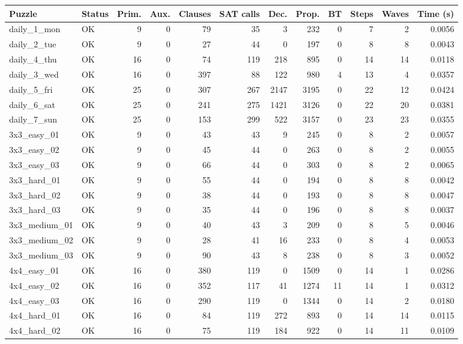 \begin{tabular}{l l r r r r r r r r r r }
\hline
Puzzle & Status & Prim. & Aux. & Clauses & SAT calls & Dec. & Prop. & BT & Steps & Waves & Time (s) \\
\hline
daily\_1\_mon & OK & 9 & 0 & 79 & 35 & 3 & 232 & 0 & 7 & 2 & 0.0056 \\
daily\_2\_tue & OK & 9 & 0 & 27 & 44 & 0 & 197 & 0 & 8 & 8 & 0.0043 \\
daily\_4\_thu & OK & 16 & 0 & 74 & 119 & 218 & 895 & 0 & 14 & 14 & 0.0118 \\
daily\_3\_wed & OK & 16 & 0 & 397 & 88 & 122 & 980 & 4 & 13 & 4 & 0.0357 \\
daily\_5\_fri & OK & 25 & 0 & 307 & 267 & 2147 & 3195 & 0 & 22 & 12 & 0.0424 \\
daily\_6\_sat & OK & 25 & 0 & 241 & 275 & 1421 & 3126 & 0 & 22 & 20 & 0.0381 \\
daily\_7\_sun & OK & 25 & 0 & 153 & 299 & 522 & 3157 & 0 & 23 & 23 & 0.0355 \\
3x3\_easy\_01 & OK & 9 & 0 & 43 & 43 & 9 & 245 & 0 & 8 & 2 & 0.0057 \\
3x3\_easy\_02 & OK & 9 & 0 & 45 & 44 & 0 & 263 & 0 & 8 & 2 & 0.0055 \\
3x3\_easy\_03 & OK & 9 & 0 & 66 & 44 & 0 & 303 & 0 & 8 & 2 & 0.0065 \\
3x3\_hard\_01 & OK & 9 & 0 & 55 & 44 & 0 & 194 & 0 & 8 & 8 & 0.0042 \\
3x3\_hard\_02 & OK & 9 & 0 & 38 & 44 & 0 & 193 & 0 & 8 & 8 & 0.0047 \\
3x3\_hard\_03 & OK & 9 & 0 & 35 & 44 & 0 & 196 & 0 & 8 & 8 & 0.0037 \\
3x3\_medium\_01 & OK & 9 & 0 & 40 & 43 & 3 & 209 & 0 & 8 & 5 & 0.0046 \\
3x3\_medium\_02 & OK & 9 & 0 & 28 & 41 & 16 & 233 & 0 & 8 & 4 & 0.0053 \\
3x3\_medium\_03 & OK & 9 & 0 & 90 & 43 & 8 & 238 & 0 & 8 & 3 & 0.0052 \\
4x4\_easy\_01 & OK & 16 & 0 & 380 & 119 & 0 & 1509 & 0 & 14 & 1 & 0.0286 \\
4x4\_easy\_02 & OK & 16 & 0 & 352 & 117 & 41 & 1274 & 11 & 14 & 1 & 0.0312 \\
4x4\_easy\_03 & OK & 16 & 0 & 290 & 119 & 0 & 1344 & 0 & 14 & 2 & 0.0180 \\
4x4\_hard\_01 & OK & 16 & 0 & 84 & 119 & 272 & 893 & 0 & 14 & 14 & 0.0115 \\
4x4\_hard\_02 & OK & 16 & 0 & 75 & 119 & 184 & 922 & 0 & 14 & 11 & 0.0109 \\

\end{tabular}
